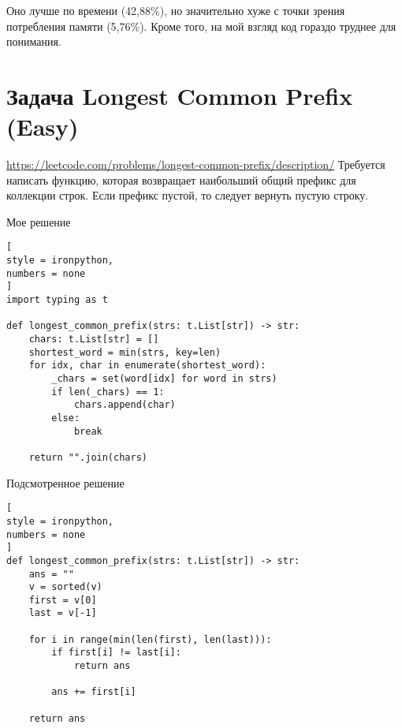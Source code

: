 \documentclass[%
	11pt,
	a4paper,
	utf8,
		]{article}
\begin{document}
Оно лучше по времени (42,88\%), но значительно хуже с точки зрения потребления памяти (5,76\%). Кроме того, на мой взгляд код гораздо труднее для понимания.

\section{Задача Longest Common Prefix (Easy)}

\noindent\url{https://leetcode.com/problems/longest-common-prefix/description/} Требуется написать функцию, которая возвращает наибольший общий префикс для коллекции строк. Если префикс пустой, то следует вернуть пустую строку.

Мое решение
\begin{lstlisting}[
style = ironpython,
numbers = none
]
import typing as t

def longest_common_prefix(strs: t.List[str]) -> str:
    chars: t.List[str] = []
    shortest_word = min(strs, key=len)
    for idx, char in enumerate(shortest_word):
        _chars = set(word[idx] for word in strs)
        if len(_chars) == 1:
            chars.append(char)
        else:
            break
    
    return "".join(chars)
\end{lstlisting}

Подсмотренное решение
\begin{lstlisting}[
style = ironpython,
numbers = none
]
def longest_common_prefix(strs: t.List[str]) -> str:
    ans = ""
    v = sorted(v)
    first = v[0]
    last = v[-1]
    
    for i in range(min(len(first), len(last))):
        if first[i] != last[i]:
            return ans
        
        ans += first[i]
    
    return ans
\end{lstlisting}




\begin{thebibliography}{99}
	

	
	
	
\end{thebibliography}


\end{document}
